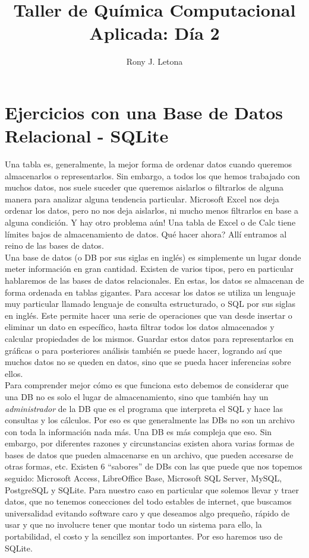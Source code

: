 \documentclass[10pt,letterpaper]{article}
\author{Rony J. Letona}
\title{Taller de Qu\'imica Computacional Aplicada: D\'ia 2}
\begin{document}
\maketitle

\section{Ejercicios con una Base de Datos Relacional - SQLite}
Una tabla es, generalmente, la mejor forma de ordenar datos cuando queremos almacenarlos o representarlos. Sin embargo, a todos los que hemos trabajado con muchos datos, nos suele suceder que queremos aislarlos o filtrarlos de alguna manera para analizar alguna tendencia particular. Microsoft Excel nos deja ordenar los datos, pero no nos deja aislarlos, ni mucho menos filtrarlos en base a alguna condici\'on. Y hay otro problema a\'un! Una tabla de Excel o de Calc tiene l\'imites bajos de almacenamiento de datos. Qu\'e hacer ahora? All\'i entramos al reino de las bases de datos.\\

Una base de datos (o DB por sus siglas en ingl\'es) es simplemente un lugar donde meter informaci\'on en gran cantidad. Existen de varios tipos, pero en particular hablaremos de las bases de datos relacionales. En estas, los datos se almacenan de forma ordenada en tablas gigantes. Para accesar los datos se utiliza un lenguaje muy particular llamado lenguaje de consulta estructurado, o SQL por sus siglas en ingl\'es. Este permite hacer una serie de operaciones que van desde insertar o eliminar un dato en espec\'ifico, hasta filtrar todos los datos almacenados y calcular propiedades de los mismos. Guardar estos datos para representarlos en gr\'aficas o para posteriores an\'alisis tambi\'en se puede hacer, logrando as\'i que muchos datos no se queden en datos, sino que se pueda hacer inferencias sobre ellos.\\

Para comprender mejor c\'omo es que funciona esto debemos de considerar que una DB no es solo el lugar de almacenamiento, sino que tambi\'en hay un \emph{administrador} de la DB que es el programa que interpreta el SQL y hace las consultas y los c\'alculos. Por eso es que generalmente las DBs no son un archivo con toda la informaci\'on nada m\'as. Una DB es m\'as compleja que eso. Sin embargo, por diferentes razones y circunstancias existen ahora varias formas de bases de datos que pueden almacenarse en un archivo, que pueden accesarse de otras formas, etc. Existen 6 ``sabores'' de DBs con las que puede que nos topemos seguido: Microsoft Access, LibreOffice Base, Microsoft SQL Server, MySQL, PostgreSQL y SQLite. Para nuestro caso en particular que solemos llevar y traer datos, que no tenemos conecciones del todo estables de internet, que buscamos universalidad evitando software caro y que deseamos algo preque\~no, r\'apido de usar y que no involucre tener que montar todo un sistema para ello, la portabilidad, el costo y la sencillez son importantes. Por eso haremos uso de SQLite.
\newpage
\end{document}
